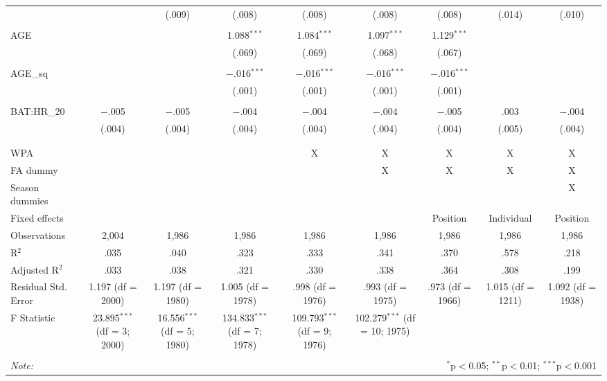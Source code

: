 \begin{table}[H]
\begin{tabular}{@{\extracolsep{5pt}}lcccccccc}
  &  & (.009) & (.008) & (.008) & (.008) & (.008) & (.014) & (.010) \\ 
  & & & & & & & & \\ 
 AGE &  &  & 1.088$^{***}$ & 1.084$^{***}$ & 1.097$^{***}$ & 1.129$^{***}$ &  &  \\ 
  &  &  & (.069) & (.069) & (.068) & (.067) &  &  \\ 
  & & & & & & & & \\ 
 AGE\_sq &  &  & $-$.016$^{***}$ & $-$.016$^{***}$ & $-$.016$^{***}$ & $-$.016$^{***}$ &  &  \\ 
  &  &  & (.001) & (.001) & (.001) & (.001) &  &  \\ 
  & & & & & & & & \\ 
 BAT:HR\_20 & $-$.005 & $-$.005 & $-$.004 & $-$.004 & $-$.004 & $-$.005 & .003 & $-$.004 \\ 
  & (.004) & (.004) & (.004) & (.004) & (.004) & (.004) & (.005) & (.004) \\ 
  & & & & & & & & \\ 
\hline \\[-1.8ex] 
WPA &  &  &  & X & X & X & X & X \\ 
FA dummy &  &  &  &  & X & X & X & X \\ 
Season dummies &  &  &  &  &  &  &  & X \\ 
Fixed effects &  &  &  &  &  & Position & Individual & Position \\ 
Observations & 2,004 & 1,986 & 1,986 & 1,986 & 1,986 & 1,986 & 1,986 & 1,986 \\ 
R$^{2}$ & .035 & .040 & .323 & .333 & .341 & .370 & .578 & .218 \\ 
Adjusted R$^{2}$ & .033 & .038 & .321 & .330 & .338 & .364 & .308 & .199 \\ 
Residual Std. Error & 1.197 (df = 2000) & 1.197 (df = 1980) & 1.005 (df = 1978) & .998 (df = 1976) & .993 (df = 1975) & .973 (df = 1966) & 1.015 (df = 1211) & 1.092 (df = 1938) \\ 
F Statistic & 23.895$^{***}$ (df = 3; 2000) & 16.556$^{***}$ (df = 5; 1980) & 134.833$^{***}$ (df = 7; 1978) & 109.793$^{***}$ (df = 9; 1976) & 102.279$^{***}$ (df = 10; 1975) &  &  &  \\ 
\hline 
\hline \\[-1.8ex] 
\textit{Note:}  & \multicolumn{8}{r}{$^{*}$p$<$0.05; $^{**}$p$<$0.01; $^{***}$p$<$0.001} \\ 
\end{tabular} 
\end{table} 
